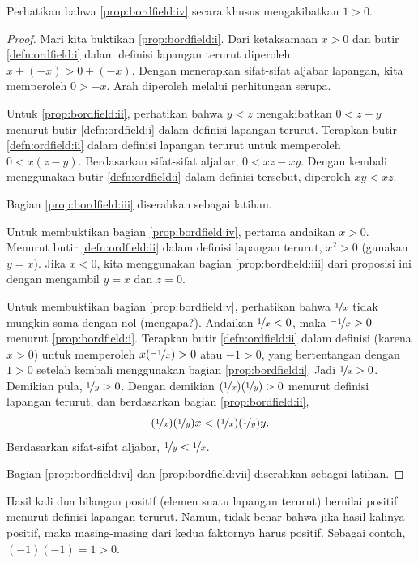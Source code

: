 Perhatikan bahwa \ref{prop:bordfield:iv} secara khusus mengakibatkan $1 > 0$.

\begin{proof}
Mari kita buktikan \ref{prop:bordfield:i}.  Dari ketaksamaan $x > 0$ dan butir
\ref{defn:ordfield:i} dalam definisi lapangan terurut diperoleh
$x + (-x) > 0 + (-x)$.  Dengan menerapkan sifat-sifat aljabar lapangan, kita
memperoleh $0 > -x$.  Arah  diperoleh melalui perhitungan serupa.

Untuk \ref{prop:bordfield:ii}, perhatikan bahwa $y < z$ mengakibatkan
$0 < z - y$ menurut
butir \ref{defn:ordfield:i} dalam definisi lapangan terurut.
Terapkan butir
\ref{defn:ordfield:ii} dalam definisi lapangan terurut untuk memperoleh
$0 < x(z-y)$.  Berdasarkan sifat-sifat aljabar, $0 < xz - xy$.
Dengan kembali menggunakan butir
\ref{defn:ordfield:i} dalam definisi tersebut, diperoleh $xy < xz$.

Bagian \ref{prop:bordfield:iii} diserahkan sebagai latihan.

Untuk membuktikan bagian \ref{prop:bordfield:iv}, pertama andaikan $x > 0$.
Menurut butir \ref{defn:ordfield:ii} dalam definisi lapangan terurut,
$x^2 > 0$ (gunakan $y=x$).  Jika $x < 0$, kita menggunakan
bagian \ref{prop:bordfield:iii} dari proposisi ini dengan mengambil $y=x$ dan
$z=0$.

Untuk membuktikan bagian \ref{prop:bordfield:v}, perhatikan bahwa
$\nicefrac{1}{x}$ tidak mungkin sama dengan nol (mengapa?).
Andaikan $\nicefrac{1}{x} < 0$,
maka $\nicefrac{-1}{x} > 0$ menurut \ref{prop:bordfield:i}.
Terapkan butir \ref{defn:ordfield:ii} dalam definisi (karena $x > 0$) untuk memperoleh
$x(\nicefrac{-1}{x}) > 0$ atau $-1 > 0$, yang bertentangan dengan $1 > 0$ setelah kembali menggunakan bagian
\ref{prop:bordfield:i}.  Jadi $\nicefrac{1}{x} > 0$.
Demikian pula, $\nicefrac{1}{y} > 0$.  Dengan demikian $(\nicefrac{1}{x})(\nicefrac{1}{y}) > 0$
menurut definisi lapangan terurut, dan berdasarkan bagian \ref{prop:bordfield:ii},
\begin{equation*}
(\nicefrac{1}{x})(\nicefrac{1}{y})x < (\nicefrac{1}{x})(\nicefrac{1}{y})y .
\end{equation*}
Berdasarkan sifat-sifat aljabar, $\nicefrac{1}{y} < \nicefrac{1}{x}$.

Bagian \ref{prop:bordfield:vi} dan \ref{prop:bordfield:vii} diserahkan sebagai
latihan.
\end{proof}

Hasil kali dua bilangan positif (elemen suatu lapangan terurut) bernilai positif
menurut definisi lapangan terurut.
Namun, tidak benar bahwa jika hasil kalinya positif, maka masing-masing dari kedua
faktornya harus positif.  Sebagai contoh, $(-1)(-1) = 1 > 0$.

